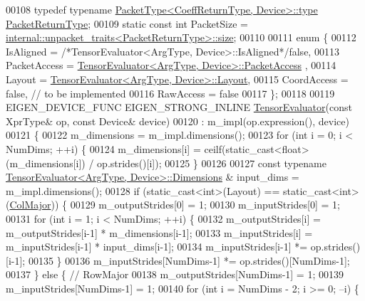 \begin{DoxyCode}
00108   \textcolor{keyword}{typedef} \textcolor{keyword}{typename} \hyperlink{group___sparse_core___module}{PacketType<CoeffReturnType, Device>::type} 
      \hyperlink{group___sparse_core___module}{PacketReturnType};
00109   \textcolor{keyword}{static} \textcolor{keyword}{const} \textcolor{keywordtype}{int} PacketSize = 
      \hyperlink{struct_eigen_1_1internal_1_1unpacket__traits}{internal::unpacket\_traits<PacketReturnType>::size};
00110 
00111   \textcolor{keyword}{enum} \{
00112     IsAligned = \textcolor{comment}{/*TensorEvaluator<ArgType, Device>::IsAligned*/}\textcolor{keyword}{false},
00113     PacketAccess = \hyperlink{struct_eigen_1_1_tensor_evaluator}{TensorEvaluator<ArgType, Device>::PacketAccess}
      ,
00114     Layout = \hyperlink{struct_eigen_1_1_tensor_evaluator}{TensorEvaluator<ArgType, Device>::Layout},
00115     CoordAccess = \textcolor{keyword}{false},  \textcolor{comment}{// to be implemented}
00116     RawAccess = \textcolor{keyword}{false}
00117   \};
00118 
00119   EIGEN\_DEVICE\_FUNC EIGEN\_STRONG\_INLINE \hyperlink{struct_eigen_1_1_tensor_evaluator}{TensorEvaluator}(\textcolor{keyword}{const} XprType& op, \textcolor{keyword}{const} Device& 
      device)
00120       : m\_impl(op.expression(), device)
00121   \{
00122     m\_dimensions = m\_impl.dimensions();
00123     \textcolor{keywordflow}{for} (\textcolor{keywordtype}{int} i = 0; i < NumDims; ++i) \{
00124       m\_dimensions[i] = ceilf(static\_cast<float>(m\_dimensions[i]) / op.strides()[i]);
00125     \}
00126 
00127     \textcolor{keyword}{const} \textcolor{keyword}{typename} \hyperlink{struct_eigen_1_1_tensor_evaluator}{TensorEvaluator<ArgType, Device>::Dimensions}
      & input\_dims = m\_impl.dimensions();
00128     \textcolor{keywordflow}{if} (static\_cast<int>(Layout) == static\_cast<int>(\hyperlink{group__enums_ggaacded1a18ae58b0f554751f6cdf9eb13a0cbd4bdd0abcfc0224c5fcb5e4f6669a}{ColMajor})) \{
00129       m\_outputStrides[0] = 1;
00130       m\_inputStrides[0] = 1;
00131       \textcolor{keywordflow}{for} (\textcolor{keywordtype}{int} i = 1; i < NumDims; ++i) \{
00132         m\_outputStrides[i] = m\_outputStrides[i-1] * m\_dimensions[i-1];
00133         m\_inputStrides[i] = m\_inputStrides[i-1] * input\_dims[i-1];
00134         m\_inputStrides[i-1] *= op.strides()[i-1];
00135       \}
00136       m\_inputStrides[NumDims-1] *= op.strides()[NumDims-1];
00137     \} \textcolor{keywordflow}{else} \{  \textcolor{comment}{// RowMajor}
00138       m\_outputStrides[NumDims-1] = 1;
00139       m\_inputStrides[NumDims-1] = 1;
00140       \textcolor{keywordflow}{for} (\textcolor{keywordtype}{int} i = NumDims - 2; i >= 0; --i) \{

\end{DoxyCode}
